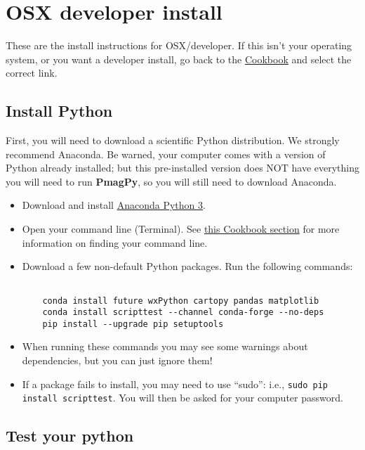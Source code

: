 \documentclass[11pt]{article}
\begin{document}
\tableofcontents

\section{OSX developer install}

These are the install instructions for OSX/developer.  If this isn't your operating system, or you want a developer install, go back to the \href{https://earthref.org/PmagPy/cookbook/#next_steps}{Cookbook} and select the correct link.


\subsection{Install Python}
First, you will need to download a scientific Python distribution.  We strongly recommend Anaconda.  Be warned, your computer comes with a version of Python already installed; but this pre-installed version does NOT have everything you will need to run {\bf PmagPy}, so you will still need to download Anaconda.

\begin{itemize}
   \item Download and install \href{https://www.anaconda.com/download}{Anaconda Python 3}.
   \item Open your command line (Terminal).  See \href{https://earthref.org/PmagPy/cookbook/#command_line}{this Cookbook section} for more information on finding your command line.
   \item Download a few non-default Python packages.  Run the following commands: \begin{verbatim}

    conda install future wxPython cartopy pandas matplotlib
    conda install scripttest --channel conda-forge --no-deps
    pip install --upgrade pip setuptools

\end{verbatim}
   \item When running these commands you may see some warnings about dependencies, but you can just ignore them!

\item If a package fails to install, you may need to use ``sudo'': i.e., \texttt{sudo pip install scripttest}.  You will then be asked for your computer password.

  \end{itemize}



\subsection{Test your python}
\end{document}
